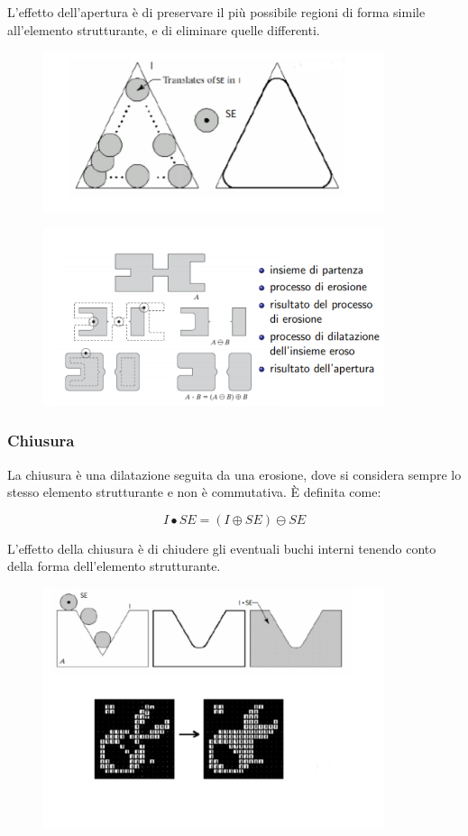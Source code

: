 L'effetto dell'apertura è di preservare il più possibile regioni di forma simile all'elemento strutturante, e di eliminare quelle
differenti.

\begin{figure}[H]
    \centering
    \includegraphics[width=10cm, keepaspectratio]{capitoli/immagini/imgs/apertura.png}
\end{figure}

\begin{figure}[H]
    \centering
    \includegraphics[width=10cm, keepaspectratio]{capitoli/immagini/imgs/apertura_bella.png}
\end{figure}

\subsubsection{Chiusura}

La chiusura è una dilatazione seguita da una erosione, dove si considera sempre lo stesso elemento strutturante e non è
commutativa. È definita come:

$$
    I \bullet SE = (I \oplus SE) \ominus SE
$$

L'effetto della chiusura è di chiudere gli eventuali buchi interni tenendo conto della forma dell'elemento strutturante.

\begin{figure}[H]
    \centering
    \includegraphics[width=10cm, keepaspectratio]{capitoli/immagini/imgs/chiusura.png}
\end{figure}

